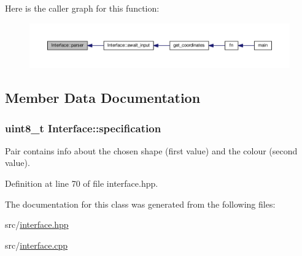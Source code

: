 Here is the caller graph for this function\+:\nopagebreak
\begin{figure}[H]
\begin{center}
\leavevmode
\includegraphics[width=350pt]{class_interface_a345faa7570aa36a31681ca850d1c283d_icgraph}
\end{center}
\end{figure}




\subsection{Member Data Documentation}
\subsubsection[{\texorpdfstring{specification}{specification}}]{\setlength{\rightskip}{0pt plus 5cm}uint8\+\_\+t Interface\+::specification\hspace{0.3cm}{\ttfamily [private]}}\hypertarget{class_interface_a8a5e47e57ef555ebbf54f345686e34cf}{}\label{class_interface_a8a5e47e57ef555ebbf54f345686e34cf}


Pair contains info about the chosen shape (first value) and the colour (second value). 



Definition at line 70 of file interface.\+hpp.



The documentation for this class was generated from the following files\+:\begin{DoxyCompactItemize}
\item 
src/\hyperlink{interface_8hpp}{interface.\+hpp}\item 
src/\hyperlink{interface_8cpp}{interface.\+cpp}\end{DoxyCompactItemize}
